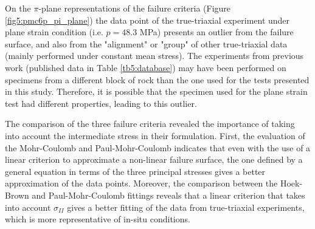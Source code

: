 On the $\pi$-plane representations of the failure criteria (Figure \ref{fig5:pmc6p_pi_plane}) the data point of the true-triaxial experiment under plane strain condition (i.e. $p = 48.3$ \si{MPa}) presents an outlier from the failure surface, and also from the "alignment" or "group" of other true-triaxial data (mainly performed under constant mean stress). The experiments from previous work (published data in Table \ref{tb5:database}) may have been performed on specimens from a different block of rock than the one used for the tests presented in this study. Therefore, it is possible that the specimen used for the plane strain test had different properties, leading to this outlier. 

The comparison of the three failure criteria revealed the importance of taking into account the intermediate stress in their formulation. First, the evaluation of the Mohr-Coulomb and Paul-Mohr-Coulomb indicates that even with the use of a linear criterion to approximate a non-linear failure surface, the one defined by a general equation in terms of the three principal stresses gives a better approximation of the data points. Moreover, the comparison between the Hoek-Brown and Paul-Mohr-Coulomb fittings reveals that a linear criterion that takes into account $\sigma_{II}$ gives a better fitting of the data from true-triaxial experiments, which is more representative of in-situ conditions. 





